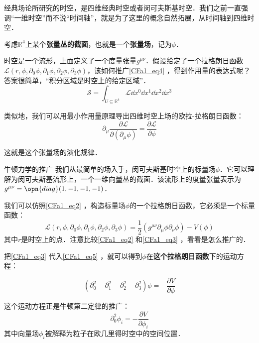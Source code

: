 经典场论所研究的时空，是四维经典时空或者闵可夫斯基时空．我们之前一直强调“一维时空”而不说“时间轴”，就是为了这里的概念自然拓展，从时间轴到四维时空．



考虑$\mathbb{R}^4$上某个\textbf{张量丛的截面}，也就是一个\textbf{张量场}，记为$\phi$．

时空是一个流形，上面定义了一个度量张量$g^{\mu\nu}$．假设给定了一个拉格朗日函数$\mathcal{L}(r, \phi, \partial_0\phi, \partial_1\phi, \partial_2\phi, \partial_3\phi)$，该如何推广\autoref{CFa1_eq4} ，得到作用量的表达式呢？答案很简单，“积分区域是时空上的给定区域”．
\begin{equation}
\mathcal{S} = \int_{U\subseteq \mathbb{R}^4} \mathcal{L}\dd x^0\dd x^1\dd x^2\dd x^3
\end{equation}

类似地，我们可以用最小作用量原理导出四维时空上场的欧拉-拉格朗日函数：
\begin{equation}\label{CFa1_eq5}
\partial_\mu \frac{\partial\mathcal{L}}{\partial(\partial_\mu \phi)} = \frac{\partial\mathcal{L}}{\partial \phi}
\end{equation}

这就是这个张量场的演化规律．

\begin{example}{牛顿力学的推广}\label{CFa1_ex1}
我们从最简单的场入手，闵可夫斯基时空上的标量场$\phi$．它可以理解为闵可夫斯基流形上，一个一维向量丛的截面．该流形上的度量张量表示为$g^{\mu\nu}=\opn{diag}(1, -1, -1, -1)$．

我们可以仿照\autoref{CFa1_eq2} ，构造标量场$\phi$的一个拉格朗日函数，它必须是一个标量函数：
\begin{equation}\label{CFa1_eq3}
\mathcal{L}(r, \phi, \partial_0\phi, \partial_1\phi, \partial_2\phi, \partial_3\phi) = \frac{1}{2}(g^{\mu\nu}\partial_\mu\phi \partial_\nu\phi) - V(\phi)
\end{equation}
其中$r$是时空上的点．注意比较\autoref{CFa1_eq2} 和\autoref{CFa1_eq3} ，看看是怎么推广的．

把\autoref{CFa1_eq3} 代入\autoref{CFa1_eq5} ，就可以得到$\phi$在\textbf{这个拉格朗日函数}下的运动方程：

\begin{equation}
(\partial^2_0-\partial^2_1-\partial^2_2-\partial^2_3)\phi = -\frac{\partial V}{\partial \phi}
\end{equation}

这个运动方程正是牛顿第二定律的推广：
\begin{equation}
\partial^2_0 \phi_i = -\frac{\partial V}{\partial \phi_i}
\end{equation}
其中向量场$\phi_i$被解释为粒子在欧几里得时空中的空间位置．

\end{example}



